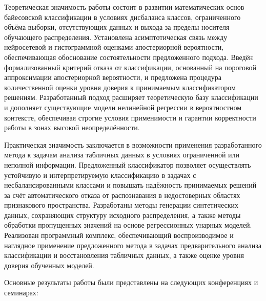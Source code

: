{\influence}

Теоретическая значимость работы состоит в развитии математических основ байесовской классификации в условиях дисбаланса классов, ограниченного объёма выборки, отсутствующих данных и выхода за пределы носителя обучающего распределения. Установлена асимптотическая связь между нейросетевой и гистограммной оценками апостериорной вероятности, обеспечивающая обоснование состоятельности предложенного подхода. Введён формализованный критерий отказа от классификации, основанный на пороговой аппроксимации апостериорной вероятности, и предложена процедура количественной оценки уровня доверия к принимаемым классификатором решениям. Разработанный подход расширяет теоретическую базу классификации и дополняет существующие модели нелинейной регрессии в вероятностном контексте, обеспечивая строгие условия применимости и гарантии корректности работы в зонах высокой неопределённости.

Практическая значимость заключается в возможности применения разработанного метода к задачам анализа табличных данных в условиях ограниченной или неполной информации. Предложенный классификатор позволяет осуществлять устойчивую и интерпретируемую классификацию в задачах с несбалансированными классами и повышать надёжность принимаемых решений за счёт автоматического отказа от распознавания в недостоверных областях признакового пространства. Разработаны методы генерации синтетических данных, сохраняющих структуру исходного распределения, а также методы обработки пропущенных значений на основе регрессионных унарных моделей. Реализован программный комплекс, обеспечивающий воспроизводимое и наглядное применение предложенного метода в задачах предварительного анализа классификации и восстановления табличных данных, а также оценке уровня доверия обученных моделей.

{\probation}
Основные результаты работы были представлены на следующих конференциях и семинарах:

